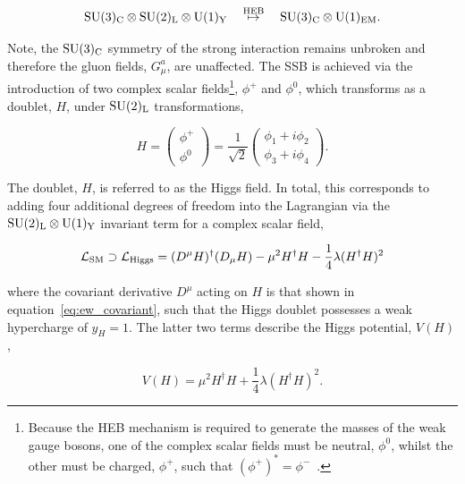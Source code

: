 \begin{equation}\label{eq:ssb}
    {\rm{SU}}(3)_{\rm{C}} \otimes {\rm{SU}}(2)_{\rm{L}} \otimes {\rm{U}}(1)_{\rm{Y}} \quad \overset{{\rm{HEB}}}{\mapsto} \quad {\rm{SU}}(3)_{\rm{C}} \otimes {\rm{U}}(1)_{\rm{EM}}.
\end{equation}

\noindent
Note, the ${\rm{SU}}(3)_{\rm{C}}$ symmetry of the strong interaction remains unbroken and therefore the gluon fields, $G^a_{\mu}$, are unaffected. The SSB is achieved via the introduction of two complex scalar fields\footnote{Because the HEB mechanism is required to generate the masses of the weak gauge bosons, one of the complex scalar fields must be neutral, $\phi^0$, whilst the other must be charged, $\phi^+$, such that $(\phi^+)^*=\phi^-$~\cite{Thomson:2013zua}.}, $\phi^+$ and $\phi^0$, which transforms as a doublet, $H$, under ${\rm{SU}}(2)_{\rm{L}}$ transformations,

\begin{equation}
    H = \begin{pmatrix}
    \phi^+ \\
    \phi^0
    \end{pmatrix} = 
    \frac{1}{\sqrt{2}}\begin{pmatrix}
    \phi_1+i\phi_2 \\
    \phi_3+i\phi_4
    \end{pmatrix}.
\end{equation}

\noindent
The doublet, $H$, is referred to as the Higgs field. In total, this corresponds to adding four additional degrees of freedom into the Lagrangian via the ${\rm{SU}(2)_{\rm{L}}}\otimes{\rm{U}}(1)_{\rm{Y}}$ invariant term for a complex scalar field,

\begin{equation}\label{eq:higgs_term}
    \mathcal{L}_{\rm{SM}} \supset \mathcal{L}_{\rm{Higgs}} = (D^\mu H)^{\dagger}(D_\mu H) - \mu^2H^{\dagger}H - \frac{1}{4}\lambda(H^{\dagger}H)^2
\end{equation}

\noindent
where the covariant derivative $D^\mu$ acting on $H$ is that shown in equation~\ref{eq:ew_covariant}, such that the Higgs doublet possesses a weak hypercharge of $y_H=1$. The latter two terms describe the Higgs potential, $V(H)$,

\begin{equation}
    V(H) = \mu^2H^{\dagger}H + \frac{1}{4}\lambda(H^{\dagger}H)^2.
\end{equation}


